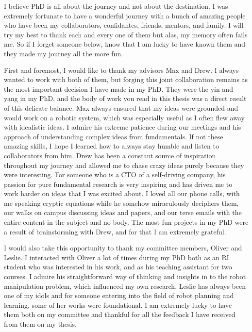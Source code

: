 \documentclass[11pt]{cmuthesis}
\begin{document}
\begin{acknowledgments}
  I believe PhD is all about the journey and not about the destination. I was
  extremely fortunate to have a
  wonderful journey
  with a bunch of amazing people who have been my collaborators, confidantes,
  friends, mentors, and family. I will try my best to thank each and every one of them
  but alas, my memory often fails me. So if I forget someone below, know that I am
  lucky to have known them and they made my journey all the more fun.

  First and foremost, I would like to thank my advisors Max and Drew. I always
  wanted to work with both of them, but forging this joint
  collaboration remains as the most important decision I have made in
  my PhD. They were the yin and yang in my PhD, and the body of work
  you read in this thesis was a direct result of this
  delicate balance. Max always ensured that my ideas were grounded and
  would work on a robotic system, which was especially useful as I often
  flew away with idealistic ideas. I admire his extreme patience
  during our meetings and his approach of understanding complex ideas
  from fundamentals. If not these amazing skills, I hope I learned how
  to always stay humble and listen to collaborators from him. Drew has been a
  constant source of inspiration throughout my journey and allowed me
  to chase crazy ideas purely because they were interesting. For someone
  who is a CTO of a self-driving company, his passion for pure fundamental
  research is very inspiring and has driven me to work harder on ideas
  that I was excited about. I loved all our phone calls, with me
  speaking cryptic equations while he somehow miraculously deciphers
  them, our walks on campus discussing ideas and papers, and our terse
  emails with the entire content in the subject and no body. The most
  fun projects in my PhD were a result of brainstorming with Drew, and
  for that I am extremely grateful.

  I would also take this opportunity to thank my committee members,
  Oliver and Leslie. I interacted with Oliver a lot of times during my
  PhD both as an RI student who was interested in his work, and as his
  teaching assistant for two courses. I admire his straightforward way
  of thinking and insights in to the robot manipulation problem, which
  influenced my own research. Leslie has always been one of my idols
  and for someone entering into the field of robot planning and
  learning, some of her works were foundational. I am extremely lucky
  to have them both on my committee and thankful for all the feedback
  I have received from them on my thesis.


\end{acknowledgments}
\end{document}

